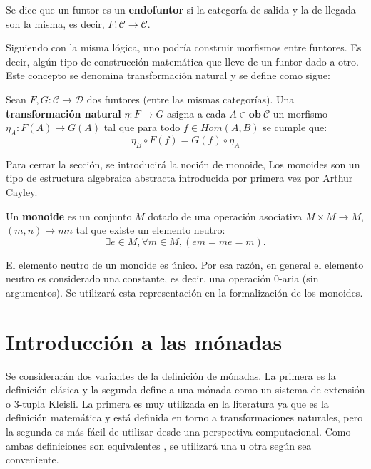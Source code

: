 Se dice que un funtor es un \textbf{endofuntor} si la categoría de salida y la de llegada son la misma, es decir, $\mathit{F} : \mathscr{C} \rightarrow \mathscr{C}$.

Siguiendo con la misma lógica, uno podría construir morfismos entre funtores. Es decir, algún tipo de construcción matemática que lleve de un funtor dado a otro. Este concepto se denomina transformación natural y se define como sigue:

\begin{definition}
Sean $\mathit{F}, \mathit{G} : \mathscr{C} \rightarrow \mathscr{D}$ dos funtores (entre las mismas categorías). Una \textbf{transformación natural} $\eta : \mathit{F} \rightarrow \mathit{G}$ asigna a cada $A \in \mathbf{ob} \ \mathscr{C}$ un morfismo $\eta_A : \mathit{F}(A) \rightarrow \mathit{G}(A)$ tal que para todo $f \in Hom(A,B)$ se cumple que: 
\begin{equation*}
	\eta_B \circ \mathit{F}(f) = \mathit{G}(f) \circ \eta_A 
\end{equation*}
\end{definition}

Para cerrar la sección, se introducirá la noción de monoide, Los monoides son un tipo de estructura algebraica abstracta introducida por primera vez por Arthur Cayley.

\begin{definition}[Monoide]\label{def:monoid}
Un \textbf{monoide} es un conjunto $M$ dotado de una operación asociativa $M \times M \rightarrow M$, $(m,n) \rightarrow mn$ tal que existe un elemento neutro:
\begin{equation*}
\exists e \in M, \forall m \in M, (em = me = m).
\end{equation*}
\end{definition}

El elemento neutro de un monoide es único. Por esa razón, en general el elemento neutro es considerado una constante, es decir, una operación 0-aria (sin argumentos). Se utilizará esta representación en la formalización de los monoides.

\section{Introducción a las mónadas}\label{monconc:monadas}

Se considerarán dos variantes de la definición de mónadas. La primera es la definición clásica y la segunda define a una mónada como un sistema de extensión o 3-tupla Kleisli. La primera es muy utilizada en la literatura ya que es la definición matemática y está definida en torno a transformaciones naturales, pero la segunda es más fácil de utilizar desde una perspectiva computacional. Como ambas definiciones son equivalentes \cite{moggi:1991}, se utilizará una u otra según sea conveniente.

